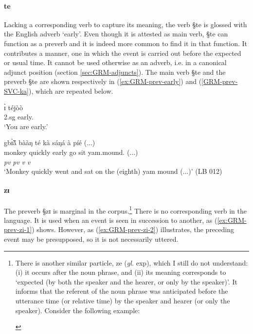 \paragraph{te}
\label{sec:GRM-preverb-te}

Lacking a corresponding verb to capture its meaning, the verb {\S te} is glossed
with
the English adverb `early'. Even though  it is attested as main verb,  {\S te}
can  function  as a preverb and it is indeed more common to find it in that
function.  It contributes a manner, one in which the
event is carried out before the expected or usual time.  It cannot be used
otherwise as an adverb, i.e. in a canonical adjunct position (section
\ref{sec:GRM-adjuncts}).  The main verb {\S te}
and the preverb {\S te} are shown respectively in  (\ref{ex:GRM-prev-early})
and  (\ref{GRM-prev-SVC-ka}), which are repeated below.


\begin{exe}
 \ex\label{ex:GRM-prev-early}
\gll  ɪ̀ téjòò\\
     {\sc 2.sg} early.{\foc}   \\
\glt  `You are early.'
\end{exe} 

\begin{exe}
\glll gbɪ̃̀ã́         	bààŋ       	té    	kà         	sáŋá 	à   
píé  {(...)}\\
monkey  	quickly 	early 	go 		sit  	{\art}
yam.mound.{\pl}   {(...)} \\
{} {\it pv} {\it pv}  {\it v} {\it v} {}  {} {} \\
\glt `Monkey quickly went and sat on the (eighth) yam mound (...)'  (LB 012)
\end{exe} 



\paragraph{zɪ}
\label{sec:GRM-preverb-after-then}

The preverb {\S zɪ} is marginal in the corpus.\footnote{There is another
similar particle, {\F ze}  ({\it gl.} {\sc exp}),  which I still do not
understand: (i) it occurs after the noun phrase, and  (ii) its meaning
corresponds to
 `expected (by both the speaker and the
hearer, or only by the speaker)'. It informs that the referent of
the noun phrase was anticipated before the utterance time (or relative time) by
the speaker and hearer (or only the speaker).  Consider  the following
example:

\begin{exe}
\end{exe}
} There is no corresponding
verb in the language.   It is used when an event is seen in
succession to another, as (\ref{ex:GRM-prev-zi-1}) shows. However,  as
(\ref{ex:GRM-prev-zi-2}) illustrates,  the preceding event may be presupposed, 
so  it is not necessarily uttered.


